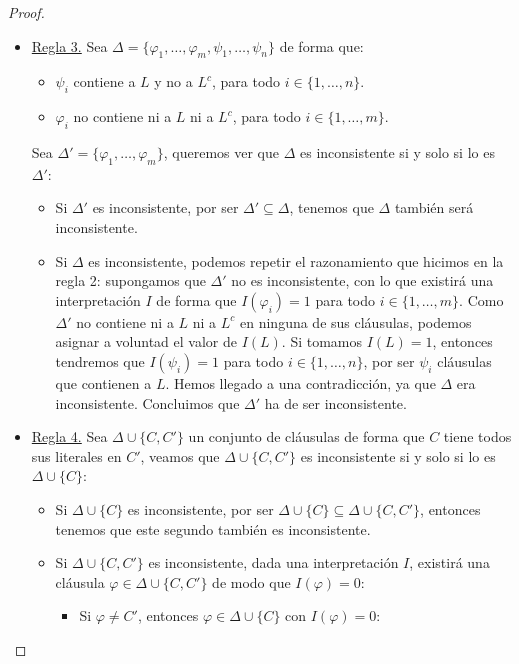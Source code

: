 \begin{teo}
\begin{proof}
\begin{itemize}
            \item \underline{Regla 3.} Sea $\Delta = \{\varphi_1,\ldots,\varphi_m,\psi_1,\ldots,\psi_n\}$ de forma que:
                \begin{itemize}
                    \item $\psi_i$ contiene a $L$ y no a $L^c$, para todo $i \in \{1,\ldots,n\}$.
                    \item $\varphi_i$ no contiene ni a $L$ ni a $L^c$, para todo $i \in \{1,\ldots,m\}$.
                \end{itemize}
                Sea $\Delta' = \{\varphi_1,\ldots,\varphi_m\}$, queremos ver que $\Delta$ es inconsistente si y solo si lo es $\Delta'$:
                \begin{itemize}
                    \item Si $\Delta'$ es inconsistente, por ser $\Delta'\subseteq \Delta$, tenemos que $\Delta$ también será inconsistente.
                    \item Si $\Delta$ es inconsistente, podemos repetir el razonamiento que hicimos en la regla 2: supongamos que $\Delta'$ no es inconsistente, con lo que existirá una interpretación $I$ de forma que $I(\varphi_i)=1$ para todo $i \in \{1,\ldots,m\}$. Como $\Delta'$ no contiene ni a $L$ ni a $L^c$ en ninguna de sus cláusulas, podemos asignar a voluntad el valor de $I(L)$. Si tomamos $I(L)=1$, entonces tendremos que $I(\psi_i)=1$ para todo $i \in \{1,\ldots,n\}$, por ser $\psi_i$ cláusulas que contienen a $L$. Hemos llegado a una contradicción, ya que $\Delta$ era inconsistente. Concluimos que $\Delta'$ ha de ser inconsistente.
                \end{itemize}
            \item \underline{Regla 4.} Sea $\Delta\cup\{C,C'\}$ un conjunto de cláusulas de forma que $C$ tiene todos sus literales en $C'$, veamos que $\Delta\cup\{C,C'\}$ es inconsistente si y solo si lo es $\Delta\cup\{C\}$:
                \begin{itemize}
                    \item Si $\Delta\cup\{C\}$ es inconsistente, por ser $\Delta\cup\{C\}\subseteq \Delta\cup\{C,C'\}$, entonces tenemos que este segundo también es inconsistente.
                    \item Si $\Delta\cup\{C,C'\}$ es inconsistente, dada una interpretación $I$, existirá una cláusula $\varphi \in \Delta\cup\{C,C'\}$ de modo que $I(\varphi)=0$:
                        \begin{itemize}
                            \item Si $\varphi\neq C'$, entonces $\varphi \in \Delta\cup\{C\}$ con $I(\varphi)=0$:

\end{itemize}
\end{itemize}
\end{itemize}
\end{proof}
\end{teo}
